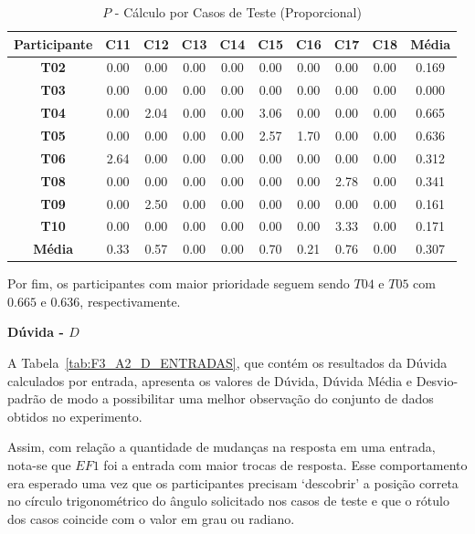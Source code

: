 \begin{table}[htbp]
	\centering
	\caption{$P$ - Cálculo por Casos de Teste (Proporcional)}
	\begin{tabular}{|c|c|c|c|c|c|c|c|c|c|}
		\hline
		\rowcolor[HTML]{D9D9D9} 
		\cellcolor[HTML]{D0CECE}\textbf{Participante} & \textbf{C11} & \textbf{C12} & \textbf{C13} & \textbf{C14} & \textbf{C15} & \textbf{C16} & \textbf{C17} & \textbf{C18} & \textbf{Média} \\ \hline
		\textbf{T02} & 0.00 & 0.00 & 0.00 & 0.00 & 0.00 & 0.00 & 0.00 & 0.00 & 0.169 \\ \hline
		\rowcolor[HTML]{F2F2F2} 
		\textbf{T03} & 0.00 & 0.00 & 0.00 & 0.00 & 0.00 & 0.00 & 0.00 & 0.00 & 0.000 \\ \hline
		\textbf{T04} & 0.00 & 2.04 & 0.00 & 0.00 & 3.06 & 0.00 & 0.00 & 0.00 & 0.665 \\ \hline
		\rowcolor[HTML]{F2F2F2} 
		\textbf{T05} & 0.00 & 0.00 & 0.00 & 0.00 & 2.57 & 1.70 & 0.00 & 0.00 & 0.636 \\ \hline
		\textbf{T06} & 2.64 & 0.00 & 0.00 & 0.00 & 0.00 & 0.00 & 0.00 & 0.00 & 0.312 \\ \hline
		\rowcolor[HTML]{F2F2F2} 
		\textbf{T08} & 0.00 & 0.00 & 0.00 & 0.00 & 0.00 & 0.00 & 2.78 & 0.00 & 0.341 \\ \hline
		\textbf{T09} & 0.00 & 2.50 & 0.00 & 0.00 & 0.00 & 0.00 & 0.00 & 0.00 & 0.161 \\ \hline
		\rowcolor[HTML]{F2F2F2} 
		\textbf{T10} & 0.00 & 0.00 & 0.00 & 0.00 & 0.00 & 0.00 & 3.33 & 0.00 & 0.171 \\ \hline
		\rowcolor[HTML]{D0CECE} 
		\textbf{Média} & 0.33 & 0.57 & 0.00 & 0.00 & 0.70 & 0.21 & 0.76 & 0.00 & 0.307 \\ \hline
	\end{tabular}
	\label{tab:F3_A2_P_CASOS_PROPORCIONAL_}
\end{table}

Por fim, os participantes com maior prioridade seguem sendo $T04$ e $T05$ com $0.665$ e $0.636$, respectivamente.
 
\textbf{Dúvida - $D$}

A Tabela~\ref{tab:F3_A2_D_ENTRADAS}, que contém os resultados da Dúvida calculados por entrada, apresenta os valores de Dúvida, Dúvida Média e Desvio-padrão de modo a possibilitar uma melhor observação do conjunto de dados obtidos no experimento.

Assim, com relação a quantidade de mudanças na resposta em uma entrada, nota-se que $EF1$ foi a entrada com maior trocas de resposta. Esse comportamento era esperado uma vez que os participantes precisam `descobrir' a posição correta no círculo trigonométrico do ângulo solicitado nos casos de teste e que o rótulo dos casos coincide com o valor em grau ou radiano. 

